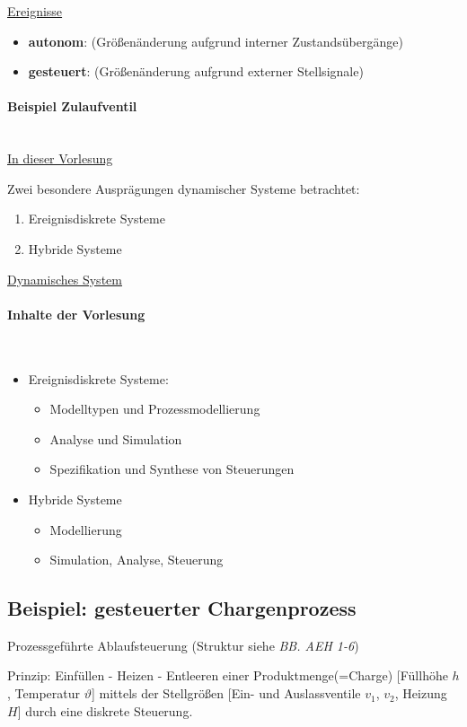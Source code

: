 \documentclass[12pt,a4paper]{scrartcl}
\numberwithin{equation}{section}
\newcommand{\properparagraph}[1]{\paragraph{#1}\mbox{}\\}
\begin{document}
\underline{Ereignisse}
\begin{itemize}
	\item \textbf{autonom}: (Größenänderung aufgrund interner Zustandsübergänge)
	\item \textbf{gesteuert}: (Größenänderung aufgrund externer Stellsignale)
\end{itemize}

\properparagraph{Beispiel Zulaufventil}


\underline{In dieser Vorlesung}

Zwei besondere Ausprägungen dynamischer Systeme betrachtet:
\begin{enumerate}
	\item Ereignisdiskrete Systeme
	\item Hybride Systeme 
\end{enumerate}

\underline{Dynamisches System}

\begin{figure}[H]
	\centering
\end{figure}

\properparagraph{Inhalte der Vorlesung}

\begin{itemize}
	\item Ereignisdiskrete Systeme: 
	\begin{itemize}
		\item Modelltypen und Prozessmodellierung
		\item Analyse und Simulation
		\item Spezifikation und Synthese von Steuerungen
	\end{itemize}
	\item Hybride Systeme
	\begin{itemize}
		\item Modellierung
		\item Simulation, Analyse, Steuerung
	\end{itemize} 
\end{itemize}


\subsection{Beispiel: gesteuerter Chargenprozess}
Prozessgeführte Ablaufsteuerung (Struktur siehe \textit{BB. AEH 1-6})

Prinzip: Einfüllen - Heizen - Entleeren einer Produktmenge(=Charge) [Füllhöhe $h$, Temperatur $\vartheta$] mittels der Stellgrößen [Ein- und Auslassventile $v_1$, $v_2$, Heizung $H$] durch eine diskrete Steuerung.
\end{document}
